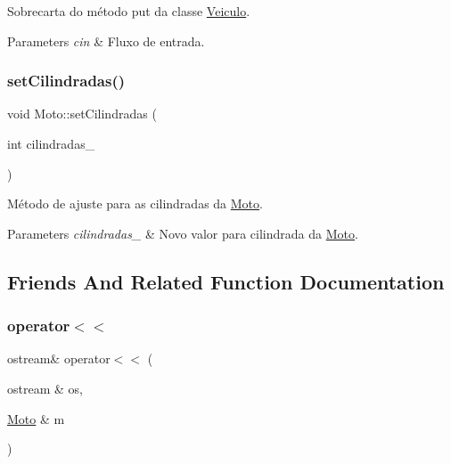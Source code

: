 Sobrecarta do método put da classe \hyperlink{classVeiculo}{Veiculo}. 


\begin{DoxyParams}{Parameters}
{\em cin} & Fluxo de entrada. \\
\hline
\end{DoxyParams}
\mbox{\label{classMoto_a41e3197a2e7ce5e3485b9cd817cb5b41}} 
\subsubsection{\texorpdfstring{set\+Cilindradas()}{setCilindradas()}}
{\footnotesize\ttfamily void Moto\+::set\+Cilindradas (\begin{DoxyParamCaption}\item[{int}]{cilindradas\+\_\+ }\end{DoxyParamCaption})}



Método de ajuste para as cilindradas da \hyperlink{classMoto}{Moto}. 


\begin{DoxyParams}{Parameters}
{\em cilindradas\+\_\+} & Novo valor para cilindrada da \hyperlink{classMoto}{Moto}. \\
\hline
\end{DoxyParams}


\subsection{Friends And Related Function Documentation}
\mbox{\label{classMoto_a892a6e71f09bb2e6b752bf12a72bbdc2}} 
\subsubsection{\texorpdfstring{operator$<$$<$}{operator<<}}
{\footnotesize\ttfamily ostream\& operator$<$$<$ (\begin{DoxyParamCaption}\item[{ostream \&}]{os,  }\item[{\hyperlink{classMoto}{Moto} \&}]{m }\end{DoxyParamCaption})\hspace{0.3cm}{\ttfamily [friend]}}



